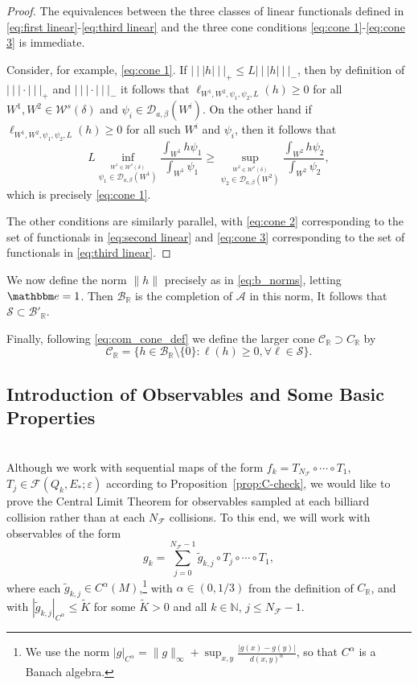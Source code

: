 \documentclass{amsart}
\numberwithin{equation}{section}
\newcommand\cA{{\mathcal A}}
\newcommand\cB{{\mathcal B}}
\newcommand\cC{{\mathcal C}}
\newcommand\cD{{\mathcal D}}
\newcommand\cF{{\mathcal F}}
\newcommand\cS{{\mathcal S}}
\newcommand\cW{{\mathcal W}}
\newcommand\bR{{\mathbb R}}
\newcommand\ve{\varepsilon}
\newcommand{\bbe}{\mathbbm e}
\newcommand{\tri}{{|\:\!\!|\:\!\!|}}
\begin{document}
\begin{proof}
The equivalences between the three classes of linear functionals defined in \eqref{eq:first linear}-\eqref{eq:third linear}
and the three cone conditions \eqref{eq:cone 1}-\eqref{eq:cone 3} is immediate.

Consider, for example, \eqref{eq:cone 1}.  If $\tri h \tri_+ \le L \tri h \tri_-$, then by definition of $\tri \cdot \tri_+$ and $\tri \cdot \tri_-$ it follows that
$\ell_{W^1, W^2, \psi_1, \psi_2, L}(h) \ge 0$ for all $W^1, W^2 \in \cW^s(\delta)$ and $\psi_i \in \cD_{a, \beta}(W^i)$.
On the other hand if $\ell_{W^1, W^2, \psi_1, \psi_2, L}(h) \ge 0$ for all such $W^i$ and $\psi_i$, then
it follows that 
\[
L \inf_{\stackrel{W^1 \in \cW^s(\delta)}{\psi_1 \in \cD_{a,\beta}(W^1)}} \frac{\int_{W^1} h \psi_1}{\int_{W^1} \psi_1}
\ge \sup_{\stackrel{W^2 \in \cW^s(\delta)}{\psi_2 \in \cD_{a, \beta}(W^2)}} \frac{\int_{W^2} h \psi_2}{\int_{W^2} \psi_2} ,
\] 
which is precisely \eqref{eq:cone 1}.

The other conditions are similarly parallel, with \eqref{eq:cone 2} corresponding to the set of functionals in \eqref{eq:second linear} and \eqref{eq:cone 3} corresponding to the set of functionals in \eqref{eq:third linear}. 
\end{proof}

We now define the norm $\| h \|$ precisely as in \eqref{eq:b_norms}, letting $\bbe = 1$.  Then $\cB_{\bR}$ is the completion
of $\cA$ in this norm,  It follows that $\cS \subset \cB'_{\bR}$.

Finally, following \eqref{eq:com_cone_def} we define the larger cone $\cC_{\bR} \supset C_{\bR}$ by
\[
\cC_{\bR} = \{ h \in \cB_{\bR} \setminus \{ 0 \} : \ell(h) \ge 0, \forall \ell \in \cS \} .
\] 


\subsection{Introduction of Observables  and Some Basic Properties }\ \\
\label{sec:check O1_a}
Although we work with sequential maps of the form $f_k = T_{N_\cF} \circ \cdots \circ T_1$,
$T_j \in \cF(Q_k, E_*; \ve)$ according to Proposition~\ref{prop:C-check},
we would like to prove the Central Limit Theorem for observables sampled at each billiard 
collision rather than at each $N_\cF$ collisions.  To this end, we will work with observables
of the form
\begin{equation}
\label{eq:observe}
g_k = \sum_{j=0}^{N_{\cF}-1} \tilde g_{k,j} \circ T_j \circ \cdots \circ T_1,
\end{equation}
where each $\tilde g_{k,j} \in C^\alpha(M)$,\footnote{ We use the norm $|g|_{C^\alpha}=\|g\|_\infty+\sup_{x,y}\frac{|g(x)-g(y)|}{d(x,y)^\alpha}$, so that $C^\alpha$ is a Banach algebra.} with $\alpha \in (0, 1/3)$
from the definition of $C_{\bR}$, and with $|\tilde g_{k,j}|_{C^\alpha}\leq \tilde K$ for some $\tilde K>0$
and all $k \in \mathbb{N}$, $j \le N_\cF -1$. 
\end{document}

